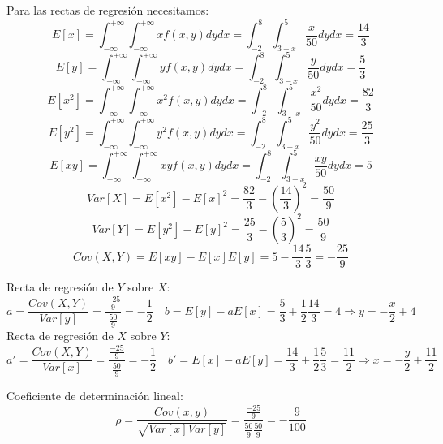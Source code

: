 \documentclass[a4paper, 11pt]{article}
\begin{document}
Para las rectas de regresión necesitamos:
\[
E[x]=\int_{-\infty}^{+\infty}\int_{-\infty}^{+\infty}xf(x,y)dydx=\int_{-2}^{8}\int_{3-x}^{5}\frac{x}{50} dydx=\frac{14}{3}
\]
\[
E[y]=\int_{-\infty}^{+\infty}\int_{-\infty}^{+\infty}yf(x,y)dydx=\int_{-2}^{8}\int_{3-x}^{5}\frac{y}{50} dydx=\frac{5}{3}
\]
\[
E[x^2]=\int_{-\infty}^{+\infty}\int_{-\infty}^{+\infty}x^2f(x,y)dydx=\int_{-2}^{8}\int_{3-x}^{5}\frac{x^2}{50} dydx=\frac{82}{3}
\]
\[
E[y^2]=\int_{-\infty}^{+\infty}\int_{-\infty}^{+\infty}y^2f(x,y)dydx=\int_{-2}^{8}\int_{3-x}^{5}\frac{y^2}{50} dydx=\frac{25}{3}
\]
\[
E[xy]=\int_{-\infty}^{+\infty}\int_{-\infty}^{+\infty}xyf(x,y)dydx=\int_{-2}^{8}\int_{3-x}^{5}\frac{xy}{50} dydx=5
\]
\[
Var[X]=E[x^2]-E[x]^2=\frac{82}{3}-\left(\frac{14}{3}\right)^2=\frac{50}{9}
\]
\[
Var[Y]=E[y^2]-E[y]^2=\frac{25}{3}-\left(\frac{5}{3}\right)^2=\frac{50}{9}
\]
\[
Cov(X,Y)=E[xy]-E[x]E[y]=5-\frac{14}{3}\frac{5}{3}=-\frac{25}{9}
\]

Recta de regresión de $Y$ sobre $X$:
\[
a=\frac{Cov(X,Y)}{Var[y]}=\frac{\frac{-25}{9}}{\frac{50}{9}}=-\frac{1}{2} \quad b=E[y]-aE[x]=\frac{5}{3}+\frac{1}{2}\frac{14}{3}=4 \Longrightarrow y=-\frac{x}{2}+4
\]
Recta de regresión de $X$ sobre $Y$:
\[
a'=\frac{Cov(X,Y)}{Var[x]}=\frac{\frac{-25}{9}}{\frac{50}{9}}=-\frac{1}{2} \quad b'=E[x]-aE[y]=\frac{14}{3}+\frac{1}{2}\frac{5}{3}=\frac{11}{2} \Longrightarrow x=-\frac{y}{2}+\frac{11}{2}
\]

Coeficiente de determinación lineal:
\[
\rho=\frac{Cov(x,y)}{\sqrt{Var[x]Var[y]}}=\frac{\frac{-25}{9}}{\frac{50}{9}\frac{50}{9}}=-\frac{9}{100}
\]
\end{document}
